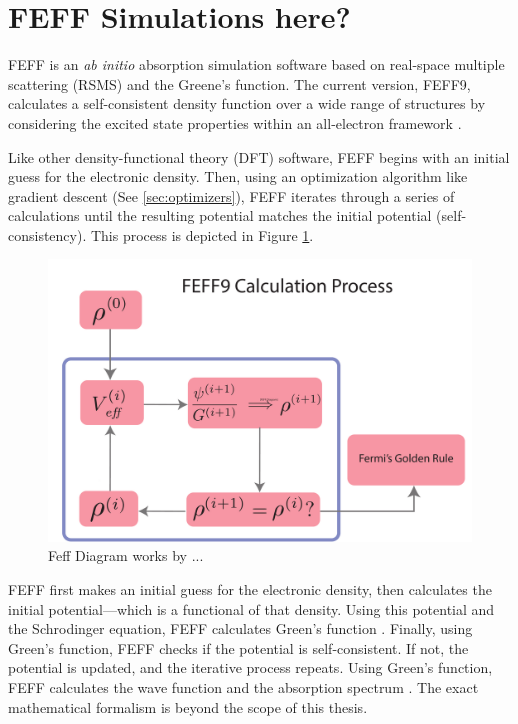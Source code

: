 \section{FEFF Simulations here?}

FEFF is an \textit{ab initio} absorption simulation software based on real-space multiple scattering (RSMS) and the Greene's function. The current version, FEFF9, calculates a self-consistent density function over a wide range of structures by considering the excited state properties within an
all-electron framework \cite{feff-new-dev}. 

Like other density-functional theory (DFT) software, FEFF begins with an initial guess for the electronic density. Then, using an optimization algorithm like gradient descent (See \ref{sec:optimizers}), FEFF iterates through a series of calculations until the resulting potential matches the initial potential (self-consistency). This process is depicted in Figure \ref{fig:feff-dft-diagram}.

\begin{figure}
    \centering
    \includegraphics[width=\linewidth]{Chapters/Figures/dft-feff-diagram.pdf}
    \caption[FEFF Diagram]{Feff Diagram works by ...}
    \label{fig:feff-dft-diagram}
\end{figure}

FEFF first makes an initial guess for the electronic density, then calculates the initial potential---which is a functional of that density. Using this potential and the Schrodinger equation, FEFF calculates Green's function \cite{greens-function-xafs-2021}. Finally, using Green's function, FEFF checks if the potential is self-consistent. If not, the potential is updated, and the iterative process repeats. Using Green's function, FEFF calculates the wave function and the absorption spectrum \cite{feff-citation} \cite{rehr2010parameter}. The exact mathematical formalism is beyond the scope of this thesis.



